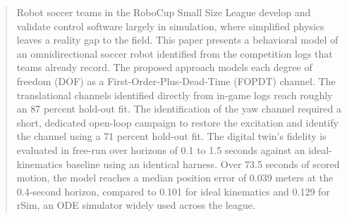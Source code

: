 \begin{abstract}
Robot soccer teams in the RoboCup Small Size League develop and validate control software largely in simulation, where simplified physics leaves a reality gap to the field. This paper presents a behavioral model of an omnidirectional soccer robot identified from the competition logs that teams already record. The proposed approach models each degree of freedom (DOF) as a First-Order-Plus-Dead-Time (FOPDT) channel. The translational channels identified directly from in-game logs reach roughly an 87 percent hold-out fit. The identification of the yaw channel required a short, dedicated open-loop campaign to restore the excitation and identify the channel using a 71 percent hold-out fit. The digital twin's fidelity is evaluated in free-run over horizons of 0.1 to 1.5 seconds against an ideal-kinematics baseline using an identical harness.  Over 73.5 seconds of scored motion, the model reaches a median position error of 0.039 meters at the 0.4-second horizon, compared to 0.101 for ideal kinematics and 0.129 for rSim, an ODE simulator widely used across the league.
\end{abstract}
